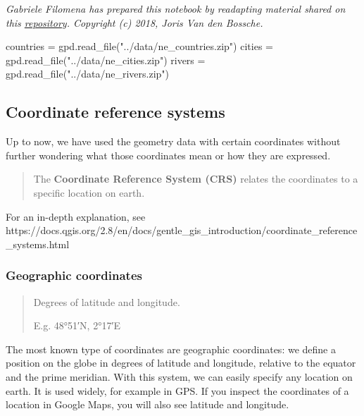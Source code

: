 \documentclass[
  letterpaper,
  DIV=11,
  numbers=noendperiod]{scrreprt}
\newenvironment{Shaded}{\begin{snugshade}}{\end{snugshade}}
\newcommand{\NormalTok}[1]{\textcolor[rgb]{0.00,0.23,0.31}{#1}}
\newcommand{\OperatorTok}[1]{\textcolor[rgb]{0.37,0.37,0.37}{#1}}
\newcommand{\StringTok}[1]{\textcolor[rgb]{0.13,0.47,0.30}{#1}}
\begin{document}
\emph{Gabriele Filomena has prepared this notebook by readapting
material shared on this
\href{https://github.com/jorisvandenbossche/geopandas-tutorial}{repository}.
Copyright (c) 2018, Joris Van den Bossche.}

\begin{Shaded}
\begin{Highlighting}[]
\NormalTok{countries }\OperatorTok{=}\NormalTok{ gpd.read\_file(}\StringTok{"../data/ne\_countries.zip"}\NormalTok{)}
\NormalTok{cities }\OperatorTok{=}\NormalTok{ gpd.read\_file(}\StringTok{"../data/ne\_cities.zip"}\NormalTok{)}
\NormalTok{rivers }\OperatorTok{=}\NormalTok{ gpd.read\_file(}\StringTok{"../data/ne\_rivers.zip"}\NormalTok{)}
\end{Highlighting}
\end{Shaded}

\subsection{Coordinate reference
systems}\label{coordinate-reference-systems}

Up to now, we have used the geometry data with certain coordinates
without further wondering what those coordinates mean or how they are
expressed.

\begin{quote}
The \textbf{Coordinate Reference System (CRS)} relates the coordinates
to a specific location on earth.
\end{quote}

For an in-depth explanation, see
https://docs.qgis.org/2.8/en/docs/gentle\_gis\_introduction/coordinate\_reference\_systems.html

\subsubsection{Geographic coordinates}\label{geographic-coordinates}

\begin{quote}
Degrees of latitude and longitude.

E.g. 48°51′N, 2°17′E
\end{quote}

The most known type of coordinates are geographic coordinates: we define
a position on the globe in degrees of latitude and longitude, relative
to the equator and the prime meridian. With this system, we can easily
specify any location on earth. It is used widely, for example in GPS. If
you inspect the coordinates of a location in Google Maps, you will also
see latitude and longitude.
\end{document}
